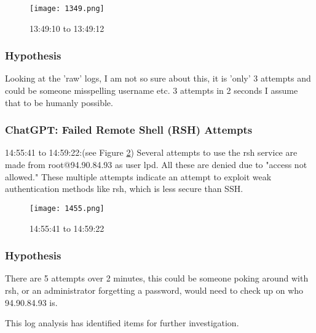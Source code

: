 \documentclass[
	letterpaper, %
	10pt, %
	unnumberedsections, %
	twoside, %
]{APAAssignment}
\begin{document}
\begin{figure}[!htp] %
	\centering
	\texttt{[image: 1349.png]}
	\caption{13:49:10 to 13:49:12}	\label{fig:1349}
\end{figure}



\subsubsection{Hypothesis}
Looking at the 'raw' logs, I am not so sure about this, it is 'only' 3 attempts and could be someone misspelling username etc. 3 attempts in 2 seconds I assume that to be humanly possible.

\subsubsection{ChatGPT: Failed Remote Shell (RSH) Attempts} 14:55:41 to 14:59:22:(see Figure \ref{fig:1455}) Several attempts to use the rsh service are made from root@94.90.84.93 as user lpd. All these are denied due to "access not allowed." These multiple attempts indicate an attempt to exploit weak authentication methods like rsh, which is less secure than SSH. \\

\begin{figure}[!htp] %
	\centering
	\texttt{[image: 1455.png]}
	\caption{14:55:41 to 14:59:22}	\label{fig:1455}
\end{figure}

\subsubsection{Hypothesis}
There are 5 attempts over 2 minutes, this could be someone poking around with rsh, or an administrator forgetting a password, would need to check up on who 94.90.84.93 is.  

This log analysis has identified items for further investigation.


\clearpage
\printbibliography %

\end{document}
